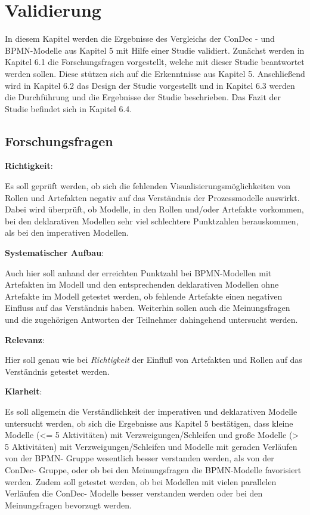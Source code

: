 \chapter{Validierung}\label{sec:chapter7}

In diesem Kapitel werden die Ergebnisse des Vergleichs der ConDec - und BPMN-Modelle aus Kapitel 5 mit Hilfe einer Studie validiert. Zunächst werden in Kapitel 6.1 die Forschungsfragen vorgestellt, welche mit dieser Studie beantwortet werden sollen. Diese stützen sich auf die Erkenntnisse aus Kapitel 5. Anschließend wird in Kapitel 6.2 das Design der Studie vorgestellt und in Kapitel 6.3 werden die Durchführung und die Ergebnisse der Studie beschrieben. Das Fazit der Studie befindet sich in Kapitel 6.4. \newline


\section{Forschungsfragen}

\textbf{Richtigkeit}: 


Es soll geprüft werden, ob sich die fehlenden Visualisierungsmöglichkeiten von Rollen und Artefakten negativ auf das Verständnis der Prozessmodelle auswirkt. Dabei wird überprüft, ob Modelle, in den Rollen und/oder Artefakte vorkommen, bei den deklarativen Modellen sehr viel schlechtere Punktzahlen herauskommen, als bei den imperativen Modellen.\newline


\textbf{Systematischer Aufbau}: 


Auch hier soll anhand der erreichten Punktzahl bei BPMN-Modellen mit Artefakten im Modell und den entsprechenden deklarativen Modellen ohne Artefakte im Modell getestet werden, ob fehlende Artefakte einen negativen Einfluss auf das Verständnis haben. Weiterhin sollen auch die Meinungsfragen und die zugehörigen Antworten der Teilnehmer dahingehend untersucht werden.\newline

\textbf{Relevanz}: 

Hier soll genau wie bei \textit{Richtigkeit} der Einfluß von Artefakten und Rollen auf das Verständnis getestet werden.


\textbf{Klarheit}: 

Es soll allgemein die Verständlichkeit der imperativen und deklarativen Modelle untersucht werden, ob sich die Ergebnisse aus Kapitel 5 bestätigen, dass kleine Modelle (<= 5 Aktivitäten) mit Verzweigungen/Schleifen und große Modelle (> 5 Aktivitäten) mit Verzweigungen/Schleifen und Modelle mit geraden Verläufen von der BPMN- Gruppe wesentlich besser verstanden werden, als von der ConDec- Gruppe, oder ob bei den Meinungsfragen die BPMN-Modelle favorisiert werden. \newline
Zudem soll getestet werden, ob bei Modellen mit vielen parallelen Verläufen die ConDec- Modelle besser verstanden werden oder bei den Meinungsfragen bevorzugt werden.

